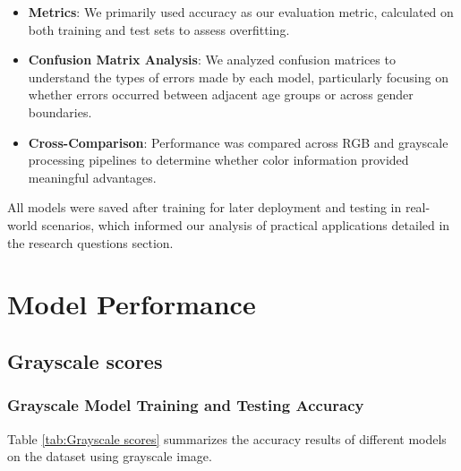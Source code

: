 \documentclass{article}
\begin{document}
\begin{itemize}
    \item \textbf{Metrics}: We primarily used accuracy as our evaluation metric, calculated on both training and test sets to assess overfitting.
    
    \item \textbf{Confusion Matrix Analysis}: We analyzed confusion matrices to understand the types of errors made by each model, particularly focusing on whether errors occurred between adjacent age groups or across gender boundaries.
    
    \item \textbf{Cross-Comparison}: Performance was compared across RGB and grayscale processing pipelines to determine whether color information provided meaningful advantages.
\end{itemize}

All models were saved after training for later deployment and testing in real-world scenarios, which informed our analysis of practical applications detailed in the research questions section.

\newpage
\section{Model Performance}
\subsection{Grayscale scores}

\subsubsection{Grayscale Model Training and Testing Accuracy}
Table \ref{tab:Grayscale scores} summarizes the accuracy results of different models on the dataset using grayscale image.
\end{document}
